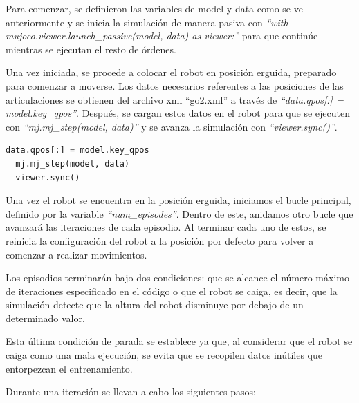 Para comenzar, se definieron las variables de model y data como se ve anteriormente y se inicia la simulación de manera pasiva 
con \textit{“with mujoco.viewer.launch\_passive(model, data) as viewer:”} para que continúe mientras se ejecutan el resto de órdenes. 

Una vez iniciada, se procede a colocar el robot en posición erguida, preparado para comenzar a moverse. Los datos necesarios referentes a las posiciones de las articulaciones se 
obtienen del archivo \Gls{xml} “go2.xml” a través de \textit{“data.qpos[:] = model.key\_qpos”}. Después, se cargan estos datos en el robot para que se ejecuten con \textit{“mj.mj\_step(model, data)”} y se 
avanza la simulación con \textit{“viewer.sync()”}.

\begin{lstlisting}[language=Python]
  data.qpos[:] = model.key_qpos
  mj.mj_step(model, data)
  viewer.sync()
\end{lstlisting}

Una vez el robot se encuentra en la posición erguida, iniciamos el bucle principal, definido por la variable \textit{“num\_episodes”}. Dentro de este, anidamos otro bucle que avanzará 
las iteraciones de cada episodio. Al terminar cada uno de estos, se reinicia la configuración del robot a la posición por defecto para volver a comenzar a realizar movimientos. 

Los episodios terminarán bajo dos condiciones: que se alcance el número máximo de iteraciones especificado en el código o que el robot se caiga, es decir, que la simulación detecte 
que la altura del robot disminuye por debajo de un determinado valor. 

Esta última condición de parada se establece ya que, al considerar que el robot se caiga como una mala ejecución, se evita que se recopilen 
datos inútiles que entorpezcan el entrenamiento.

Durante una iteración se llevan a cabo los siguientes pasos:

